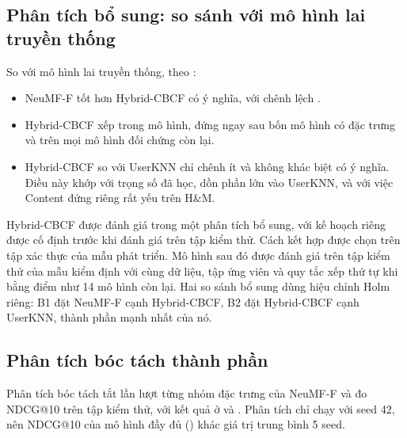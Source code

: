 

\subsection{Phân tích bổ sung: so sánh với mô hình lai truyền thống}
\label{subsec:bosung_results}

So với mô hình lai truyền thống, theo :
\begin{itemize}
    \item NeuMF-F tốt hơn Hybrid-CBCF có ý nghĩa, với chênh lệch .
    \item Hybrid-CBCF xếp  trong  mô hình, đứng ngay sau bốn mô hình có đặc trưng và trên mọi mô hình đối chứng còn lại.
    \item Hybrid-CBCF so với UserKNN chỉ chênh ít và không khác biệt có ý nghĩa. Điều này khớp với trọng số đã học, dồn phần lớn vào UserKNN, và với việc Content đứng riêng rất yếu trên H\&M.
\end{itemize}

Hybrid-CBCF được đánh giá trong một phân tích bổ sung, với kế hoạch riêng được cố định trước khi đánh giá trên tập kiểm thử. Cách kết hợp được chọn trên tập xác thực của mẫu phát triển. Mô hình sau đó được đánh giá trên tập kiểm thử của mẫu kiểm định với cùng dữ liệu, tập ứng viên và quy tắc xếp thứ tự khi bằng điểm như 14 mô hình còn lại. Hai so sánh bổ sung dùng hiệu chỉnh Holm riêng: B1 đặt NeuMF-F cạnh Hybrid-CBCF, B2 đặt Hybrid-CBCF cạnh UserKNN, thành phần mạnh nhất của nó.


\subsection{Phân tích bóc tách thành phần}
\label{subsec:ablation}

Phân tích bóc tách tắt lần lượt từng nhóm đặc trưng của NeuMF-F và đo NDCG@10 trên tập kiểm thử, với kết quả ở  và . Phân tích chỉ chạy với seed 42, nên NDCG@10 của mô hình đầy đủ () khác giá trị trung bình 5 seed.

